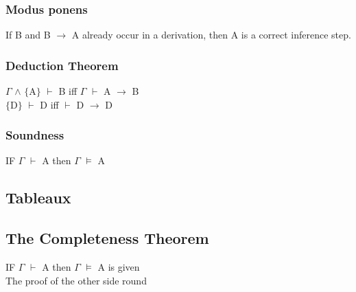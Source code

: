 \documentclass{report}
\begin{document}
 	\subsubsection{Modus ponens}
 	If B and B $\rightarrow$ A already occur in a derivation, then A is a correct inference step.
 	\subsubsection{Deduction Theorem}
 		$\Gamma$ $\wedge$ $\lbrace$A$\rbrace$ $\vdash$ B iff $\Gamma$ $\vdash$ A $\rightarrow$ B \\
 		$\lbrace$D$\rbrace$ $\vdash$ D iff $\vdash$ D $\rightarrow$ D
 	\subsubsection{Soundness}
 	IF $\Gamma$ $\vdash$ A then $\Gamma$ $\models$ A
 	
 	\subsection{Tableaux}
 	
 	\subsection{The Completeness Theorem}
 	IF $\Gamma$ $\vdash$ A then $\Gamma$ $\models$ A is given \\
 	The proof of the other side round
 	
 
\end{document}
